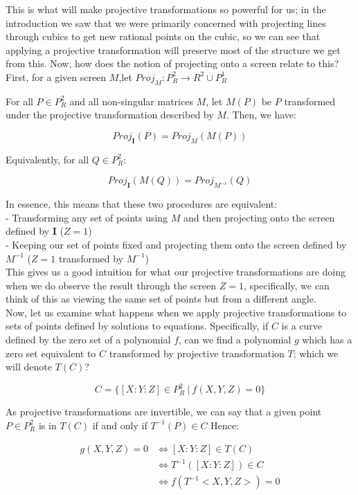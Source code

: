 \documentclass{article}
\begin{document}
This is what will make projective transformations so powerful for us; in the introduction we saw that we were primarily concerned with projecting lines through cubics to get new rational points on the cubic, so we can see that applying a projective transformation will preserve most of the structure we get from this. Now, how does the notion of projecting onto a screen relate to this? First, for a given screen $M$,let $Proj_M : P_R^2 \rightarrow R^2 \cup P_R^1 $

For all $P \in P_R^2$ and all non-singular matrices $M$, let $M(P)$ be $P$ transformed under the projective transformation described by $M$. Then, we have:

\[Proj_{\mathbf{I}}(P) = Proj_M(M(P))\]

Equivalently, for all $Q \in P_R^2$:

\[Proj_{\mathbf{I}}(M(Q)) = Proj_{M^{-1}}(Q)\]

In essence, this means that these two procedures are equivalent:\\

- Transforming any set of points using $M$ and then projecting onto the screen defined by $\mathbf{I}$ ($Z = 1$)\\

- Keeping our set of points fixed and projecting them onto the screen defined by $M^{-1}$ ($Z = 1$ transformed by $M^{-1}$)\\

This gives us a good intuition for what our projective transformations are doing when we do observe the result through the screen $Z  = 1$, specifically, we can think of this as viewing the same set of points but from a different angle.\\

Now, let us examine what happens when we apply projective transformations to sets of points defined by solutions to equations. Specifically, if $C$ is a curve defined by the zero set of a polynomial $f$, can we find a polynomial $g$ which has a zero set equivalent to $C$ transformed by projective transformation $T$; which we will denote $T(C)$?

\[C = \{[X : Y : Z] \in P_R^2 \ | \ f(X, Y, Z) = 0 \}\]

As projective transformations are invertible, we can say that a given point $P \in P_R^2$ is in $T(C)$ if and only if $T^{-1}(P) \in C$ Hence:

\begin{align*}
    g(X, Y, Z) = 0 & \iff [X : Y : Z] \in T(C)\\
                   & \iff T^{-1}([X : Y: Z]) \in C \\
                   & \iff f(T^{-1}<X, Y, Z>) = 0
\end{align*}
\end{document}

